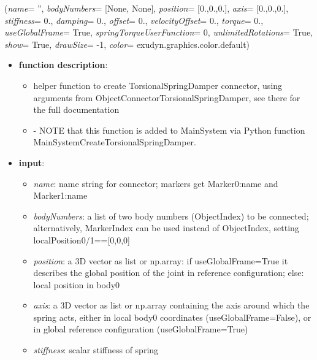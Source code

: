 %
\begin{flushleft}
\label{sec:mainsystemextensions:CreateTorsionalSpringDamper}
({\it name}= '', {\it bodyNumbers}= [None, None], {\it position}= [0.,0.,0.], {\it axis}= [0.,0.,0.], {\it stiffness}= 0., {\it damping}= 0., {\it offset}= 0., {\it velocityOffset}= 0., {\it torque}= 0., {\it useGlobalFrame}= True, {\it springTorqueUserFunction}= 0, {\it unlimitedRotations}= True, {\it show}= True, {\it drawSize}= -1, {\it color}= exudyn.graphics.color.default)
\end{flushleft}
\setlength{\itemindent}{0.7cm}
\begin{itemize}[leftmargin=0.7cm]
\item[--]
{\bf function description}: \vspace{-6pt}
\begin{itemize}[leftmargin=1.2cm]
\setlength{\itemindent}{-0.7cm}
\item[]helper function to create TorsionalSpringDamper connector, using arguments from ObjectConnectorTorsionalSpringDamper, see there for the full documentation
\item[]- NOTE that this function is added to MainSystem via Python function MainSystemCreateTorsionalSpringDamper.
\end{itemize}
\item[--]
{\bf input}: \vspace{-6pt}
\begin{itemize}[leftmargin=1.2cm]
\setlength{\itemindent}{-0.7cm}
\item[]{\it name}: name string for connector; markers get Marker0:name and Marker1:name
\item[]{\it bodyNumbers}: a list of two body numbers (ObjectIndex) to be connected; alternatively, MarkerIndex can be used instead of ObjectIndex, setting localPosition0/1==[0,0,0]
\item[]{\it position}: a 3D vector as list or np.array: if useGlobalFrame=True it describes the global position of the joint in reference configuration; else: local position in body0
\item[]{\it axis}: a 3D vector as list or np.array containing the axis around which the spring acts, either in local body0 coordinates (useGlobalFrame=False), or in global reference configuration (useGlobalFrame=True)
\item[]{\it stiffness}: scalar stiffness of spring

\end{itemize}
\end{itemize}
